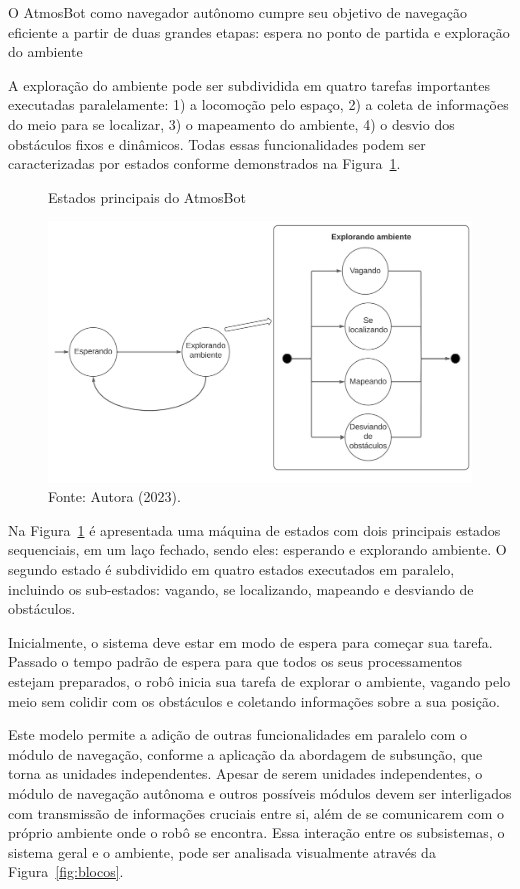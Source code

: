 O AtmosBot como navegador autônomo cumpre seu objetivo de navegação eficiente a partir de duas grandes etapas: espera no ponto de partida e exploração do ambiente

A exploração do ambiente pode ser subdividida em quatro tarefas importantes executadas paralelamente: 1) a locomoção pelo espaço, 2) a coleta de informações do meio para se localizar, 3) o mapeamento do ambiente, 4) o desvio dos obstáculos fixos e dinâmicos. Todas essas funcionalidades podem ser caracterizadas por estados conforme demonstrados na Figura~\ref{fig:estados}. 

\begin{figure}[h]
    \centering
    \caption{Estados principais do AtmosBot}
    \includegraphics[scale=0.45]{estados.png}
    \caption*{Fonte: Autora (2023).}
    \label{fig:estados}
\end{figure}

\newpage

Na Figura~\ref{fig:estados} é apresentada uma máquina de estados com dois principais estados sequenciais, em um laço fechado, sendo eles: esperando e explorando ambiente. O segundo estado é subdividido em quatro estados executados em paralelo, incluindo os sub-estados: vagando, se localizando, mapeando e desviando de obstáculos.

Inicialmente, o sistema deve estar em modo de espera para começar sua tarefa. Passado o tempo padrão de espera para que todos os seus processamentos estejam preparados, o robô inicia sua tarefa de explorar o ambiente, vagando pelo meio sem colidir com os obstáculos e coletando informações sobre a sua posição. 

Este modelo permite a adição de outras funcionalidades em paralelo com o módulo de navegação, conforme a aplicação da abordagem de subsunção, que torna as unidades independentes. Apesar de serem unidades independentes, o módulo de navegação autônoma e outros possíveis módulos devem ser interligados com transmissão de informações cruciais entre si, além de se comunicarem com o próprio ambiente onde o robô se encontra. Essa interação entre os subsistemas, o sistema geral e o ambiente, pode ser analisada visualmente através da Figura~\ref{fig:blocos}.  


